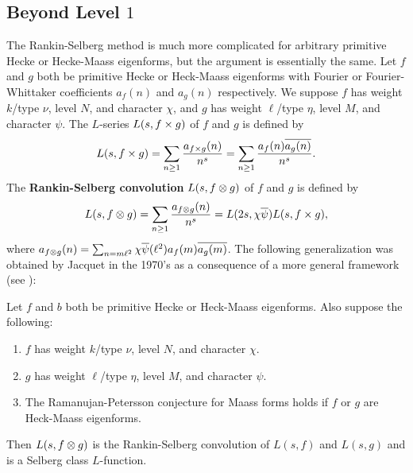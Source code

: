     \subsection*{Beyond Level \texorpdfstring{$1$}{1}}
      The Rankin-Selberg method is much more complicated for arbitrary primitive Hecke or Hecke-Maass eigenforms, but the argument is essentially the same. Let $f$ and $g$ both be primitive Hecke or Heck-Maass eigenforms with Fourier or Fourier-Whittaker coefficients $a_{f}(n)$ and $a_{g}(n)$ respectively. We suppose $f$ has weight $k$/type $\nu$, level $N$, and character $\chi$, and $g$ has weight $\ell$/type $\eta$, level $M$, and character $\psi$. 
      The $L$-series $L(s,f \times g)$ of $f$ and $g$ is defined by
      \[
        L(s,f \times g) = \sum_{n \ge 1}\frac{a_{f \times g}(n)}{n^{s}} = \sum_{n \ge 1}\frac{a_{f}(n)\overline{a_{g}(n)}}{n^{s}}.
      \]
      The \textbf{Rankin-Selberg convolution} $L(s,f \otimes g)$ of $f$ and $g$ is defined by
      \[
        L(s,f \otimes g) = \sum_{n \ge 1}\frac{a_{f \otimes g}(n)}{n^{s}} = L(2s,\chi\overline{\psi})L(s,f \times g),
      \]
      where $a_{f \otimes g}(n) = \sum_{n = m\ell^{2}}\chi\overline{\psi}(\ell^{2})a_{f}(m)\overline{a_{g}(m)}$. The following generalization was obtained by Jacquet in the 1970's as a consequence of a more general framework (see \cite{jacquet1970automorphic,jacquet1972automorphic}):

      \begin{theorem}\label{thm:generalization_Rankin_Selberg_method}
        Let $f$ and $b$ both be primitive Hecke or Heck-Maass eigenforms. Also suppose the following: 
        \begin{enumerate}[label*=(\roman*)]
          \item $f$ has weight $k$/type $\nu$, level $N$, and character $\chi$.
          \item $g$ has weight $\ell$/type $\eta$, level $M$, and character $\psi$.
          \item The Ramanujan-Petersson conjecture for Maass forms holds if $f$ or $g$ are Heck-Maass eigenforms.
        \end{enumerate}
        Then $L(s,f \otimes g)$ is the Rankin-Selberg convolution of $L(s,f)$ and $L(s,g)$ and is a Selberg class $L$-function.
      \end{theorem}

